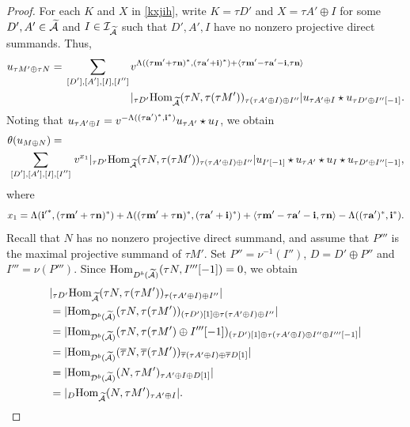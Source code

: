 \documentclass[reqno,12pt]{amsart}
\numberwithin{equation}{section}
\def\lr#1{\langle #1\rangle} \def\fin{\hfill$\square$}  \def\lra{\longrightarrow} \def\mod{\mbox{\rm \textbf{mod}}\,}\def\Mod{\mbox{\rm mod}\,}\def\top{\mbox{\rm top}\,}\def\soc{\mbox{\rm soc}\,}
\theoremstyle{plain} %
\theoremstyle{definition} %
\begin{document}
\begin{proof}
For each $K$ and $X$ in \eqref{kxjih}, write $K=\tau D'$ and $X=\tau A'\oplus I$ for some $D', A'\in\widetilde{\mathcal{A}}$ and $I\in\mathcal{I}_{\widetilde{\mathcal{A}}}$ such that $D', A', I$ have no nonzero projective direct summands. Thus,
\begin{equation*}
\begin{split}
u_{\tau M'\oplus\tau N}=\sum\limits_{\begin{smallmatrix}[D'],[A'],[I],[I'']\end{smallmatrix}}&v^{\Lambda((\tau{\bf m}'+\tau{\bf n})^*,(\tau{\bf a}'+{\bf i})^*)+\lr{\tau{\bf m}'-\tau{\bf a}'-{\bf i},\tau{\bf n}}}\\&|_{\tau D'}\Hom_{\widetilde{\A}}(\tau N,\tau(\tau M'))_{\tau (\tau A'\oplus I)\oplus I''}|u_{\tau A'\oplus I}\star u_{\tau D'\oplus I''[-1]}.
\end{split}
\end{equation*}
Noting that $u_{\tau A'\oplus I}=v^{-\Lambda((\tau{\bf a}')^\ast,{\bf i}^\ast)}u_{\tau A'}\star u_I$, we obtain
\begin{equation}\label{vzzs}
\begin{split}
&\theta(u_{M\oplus N})=\\&\sum\limits_{\begin{smallmatrix}[D'],[A'],[I],[I'']\end{smallmatrix}}v^{x_1}|_{\tau D'}\mbox{\rm Hom}_{\widetilde{\mathcal{A}}}(\tau N,\tau(\tau M'))_{\tau (\tau A'\oplus I)\oplus I''}|u_{I'[-1]}\star u_{\tau A'}\star u_I\star u_{\tau D'\oplus I''[-1]},
\end{split}
\end{equation}
where $$x_1=\Lambda({{\bf i}'}^\ast,(\tau{\bf m}'+\tau{\bf n})^\ast)+\Lambda((\tau{\bf m}'+\tau{\bf n})^*,(\tau{\bf a}'+{\bf i})^*)+\lr{\tau{\bf m}'-\tau{\bf a}'-{\bf i},\tau{\bf n}}-\Lambda((\tau{\bf a}')^\ast,{\bf i}^\ast).$$
Recall that $N$ has no nonzero projective direct summand, and assume that $P'''$ is the maximal projective summand of $\tau M'$. Set $P''=\nu^{-1}(I'')$, $D=D'\oplus P''$ and $I'''=\nu(P''')$. Since $\mbox{\rm Hom}_{D^b(\widetilde{\mathcal{A}})}(\tau N, I'''[-1])=0$, we obtain
\begin{equation*}\begin{split}
&|_{\tau D'}\mbox{\rm Hom}_{\widetilde{\mathcal{A}}}(\tau N,\tau(\tau M'))_{\tau (\tau A'\oplus I)\oplus I''}|\\
&=|\mbox{\rm Hom}_{\mathcal{D}^b(\widetilde{\mathcal{A}})}(\tau N,\tau(\tau M'))_{(\tau D')[1]\oplus\tau (\tau A'\oplus I)\oplus I''}|\\
&=|\mbox{\rm Hom}_{\mathcal{D}^b(\widetilde{\mathcal{A}})}(\tau N,\tau(\tau M')\oplus {I'''}[-1])_{(\tau D')[1]\oplus\tau (\tau A'\oplus I)\oplus I''\oplus{I'''}[-1]}|\\
&=|\mbox{\rm Hom}_{\mathcal{D}^b(\widetilde{\mathcal{A}})}(\overline{\tau} N,\overline{\tau}(\tau M'))_{\overline{\tau} (\tau A'\oplus I)\oplus \overline{\tau}D[1]}|\\
&=|\mbox{\rm Hom}_{\mathcal{D}^b(\widetilde{\mathcal{A}})}(N,\tau M')_{\tau A'\oplus I\oplus D[1]}|\\
&=|_D\mbox{\rm Hom}_{\widetilde{\mathcal{A}}}(N,\tau M')_{\tau A'\oplus I}|.\end{split}\end{equation*}


\end{proof}
\end{document}
